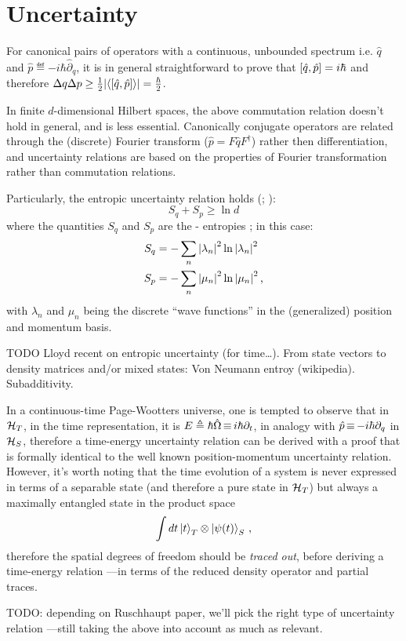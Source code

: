 \section{Uncertainty}

For canonical pairs of operators with a continuous, unbounded spectrum i.e.
$\hat{q}$ and $\hat{p} \eqdef -i\hbar\hat{\partial}_{q}$,
it is in general straightforward to prove that
$\qty[\hat{q}, \hat{p}] = i\hbar$ and therefore
$\Delta q \Delta p \geq {\frac{1}{2} \qty|\ev{\qty[\hat{q}, \hat{p}]}| = \frac{\hbar}{2}}$.

In finite $d$-dimensional Hilbert spaces, the above commutation relation doesn't hold
in general, and is less essential.
Canonically conjugate operators are related
through the (discrete) Fourier transform ($\hat{p} = F\hat{q}F^{\dagger}$)
rather then differentiation,
and uncertainty relations are based on
the properties of Fourier transformation
rather than commutation relations.

Particularly, the entropic uncertainty relation holds
(\cite[\S 2.4]{FiniteHilb}; \cite{Deutsch:Uncertainty}):
\begin{equation}
  S_q + S_p \geq \ln d
\end{equation}
where the quantities $S_q$ and $S_p$ are the - entropies
\parencite[\S {\it I}.A]{Wehner:Uncertainty}; in this case:
\begin{align}
  S_q &= -\sum_n \qty|\lambda_n |^2  \ln\qty|\lambda_n|^2 \\
  S_p &= -\sum_n \qty|\mu_n     |^2  \ln\qty|\mu_n    |^2
  \,\text{,}
\end{align}
with $\lambda_n$ and $\mu_n$ being the discrete ``wave functions'' in the
(generalized) position and momentum basis.

TODO Lloyd recent on entropic uncertainty (for time\dots).
From state vectors to density matrices and/or mixed states: Von Neumann entroy (wikipedia).
Subadditivity. 
\fi

In a continuous-time Page-Wootters universe,
one is tempted to observe that in $\mathcal{H}_T$,
in the time representation, it is $E \triangleq \hbar\hat{\Omega} \operatorname*{\equiv} i\hbar\partial_{t}$,
in analogy with $\hat{p} \operatorname*{\equiv} -i\hbar\partial_{q}$ in $\mathcal{H}_S$,
therefore a time-energy uncertainty relation can be derived
with a proof that is formally identical to the well known
position-momentum uncertainty relation. However, it's worth
noting that the time evolution of a system is never expressed
in terms of a separable state (and therefore a pure state in $\mathcal{H}_T$)
but always a maximally entangled state in the product space
\begin{equation*}
  \int dt \ket{t}_T \otimes \ket{\psi(t)}_S \, \text{,}
\end{equation*}
therefore the spatial degrees of freedom should be \emph{traced out},
before deriving a time-energy relation 
---in terms of the reduced density operator and partial traces.

TODO: depending on Ruschhaupt paper, we'll pick the right type of uncertainty
relation ---still taking the above into account as much as relevant.
